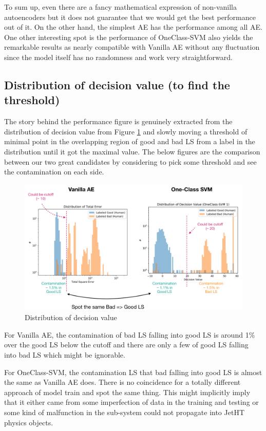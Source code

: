To sum up, even there are a fancy mathematical expression of non-vanilla autoencoders but it does not guarantee that we would get the best performance out of it. On the other hand, the simplest AE has the performance among all AE. One other interesting spot is the performance of OneClass-SVM also yields the remarkable results as nearly compatible with Vanilla AE without any fluctuation since the model itself has no randomness and work very straightforward.

\subsection{Distribution of decision value (to find the threshold)}
The story behind the performance figure is genuinely extracted from the distribution of decision value from Figure \ref{fig:2016_decision_value_dist} and slowly moving a threshold of minimal point in the overlapping region of good and bad LS from a label in the distribution until it got the maximal value. The below figures are the comparison between our two great candidates by considering to pick some threshold and see the contamination on each side.

\begin{figure}[h!]
    \centering
    \includegraphics[width=\textwidth]{images/reco/2016/decision_value_dist.png}
    \caption{Distribution of decision value}
    \label{fig:2016_decision_value_dist}
\end{figure}

For Vanilla AE, the contamination of bad LS falling into good LS is around 1\% over the good LS below the cutoff and there are only a few of good LS falling into bad LS which might be ignorable.

For OneClass-SVM, the contamination LS that bad falling into good LS is almost the same as Vanilla AE does. There is no coincidence for a totally different approach of model train and spot the same thing. This might implicitly imply that it either came from some imperfection of data in the training and testing or some kind of malfunction in the sub-system could not propagate into JetHT physics objects.

